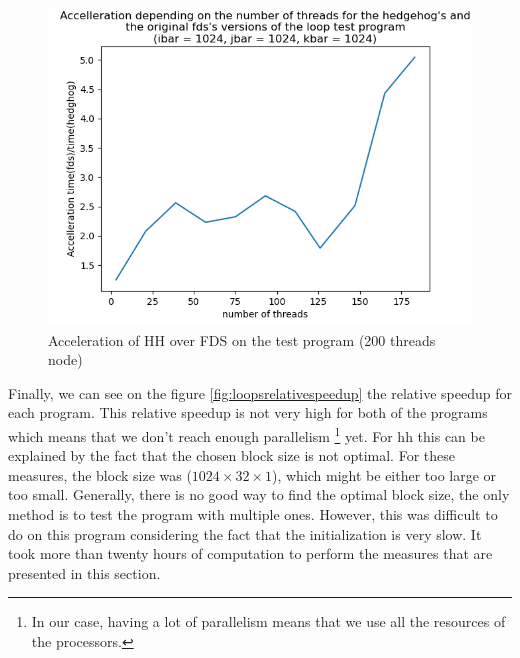 \begin{figure}[ht!]
  \begin{center}
    \includegraphics[scale=0.6]{img/fds-loops/speedup.png}
    \caption{Acceleration of HH over FDS on the test program (200 threads node)}
    \label{fig:loopsspeedup}
  \end{center}
\end{figure}

Finally, we can see on the figure \ref{fig:loopsrelativespeedup} the relative
speedup for each program. This relative speedup is not very high for both of the
programs which means that we don't reach enough parallelism \footnote{In our
case, having a lot of parallelism means that we use all the resources of the
processors.} yet. For \gls{hh} this can be explained by the fact that the chosen
block size is not optimal. For these measures, the block size was
($1024\times32\times1$), which might be either too large or too small.
Generally, there is no good way to find the optimal block size, the only method
is to test the program with multiple ones. However, this was difficult to do on
this program considering the fact that the initialization is very slow. It took
more than twenty hours of computation to perform the measures that are presented
in this section.

